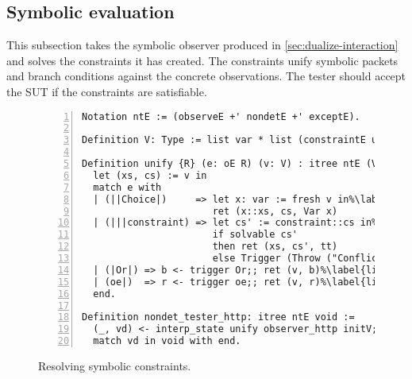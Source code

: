 \subsection{Symbolic evaluation}
\label{sec:symbolic-eval}
This subsection takes the symbolic observer produced in
\autoref{sec:dualize-interaction} and solves the constraints it has created.
The constraints unify symbolic packets and branch conditions against the
concrete observations.  The tester should accept the SUT if the constraints are
satisfiable.

\begin{figure}
\begin{lstlisting}[numbers=left]
Notation ntE := (observeE +' nondetE +' exceptE).

Definition V: Type := list var * list (constraintE unit).
  
Definition unify {R} (e: oE R) (v: V) : itree ntE (V * R) :=
  let (xs, cs) := v in
  match e with
  | (||Choice|)     => let x: var := fresh v in%\label{line:unify-choice}%
                       ret (x::xs, cs, Var x)
  | (|||constraint) => let cs' := constraint::cs in%\label{line:unify-constraint}%
                       if solvable cs'
                       then ret (xs, cs', tt)
                       else Trigger (Throw ("Conflict: " ++ print cs'))
  | (|Or|) => b <- trigger Or;; ret (v, b)%\label{line:unify-or}%
  | (oe|)  => r <- trigger oe;; ret (v, r)%\label{line:unify-observe}%
  end.

Definition nondet_tester_http: itree ntE void :=
  (_, vd) <- interp_state unify observer_http initV;;
  match vd in void with end.
\end{lstlisting}
\caption{Resolving symbolic constraints.}
\label{fig:nondet-tester}
\end{figure}

